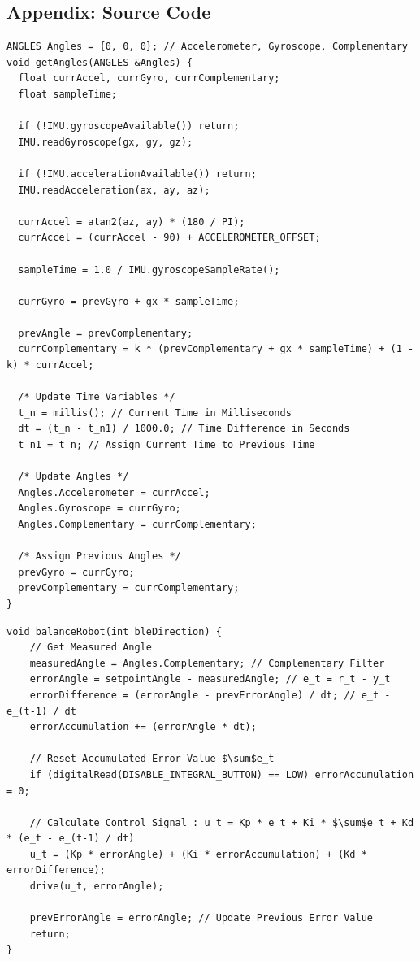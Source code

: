 \documentclass{article}
\begin{document}
\subsection{Appendix: Source Code}

\begin{lstlisting}[caption={Source Code : Arduino IMU Complementary Filter}, label={lst:arduino_angle_code}]
ANGLES Angles = {0, 0, 0}; // Accelerometer, Gyroscope, Complementary
void getAngles(ANGLES &Angles) {
  float currAccel, currGyro, currComplementary;
  float sampleTime;

  if (!IMU.gyroscopeAvailable()) return;
  IMU.readGyroscope(gx, gy, gz);

  if (!IMU.accelerationAvailable()) return;
  IMU.readAcceleration(ax, ay, az);

  currAccel = atan2(az, ay) * (180 / PI);
  currAccel = (currAccel - 90) + ACCELEROMETER_OFFSET;

  sampleTime = 1.0 / IMU.gyroscopeSampleRate();

  currGyro = prevGyro + gx * sampleTime;

  prevAngle = prevComplementary;
  currComplementary = k * (prevComplementary + gx * sampleTime) + (1 - k) * currAccel;

  /* Update Time Variables */
  t_n = millis(); // Current Time in Milliseconds
  dt = (t_n - t_n1) / 1000.0; // Time Difference in Seconds
  t_n1 = t_n; // Assign Current Time to Previous Time

  /* Update Angles */
  Angles.Accelerometer = currAccel;
  Angles.Gyroscope = currGyro;
  Angles.Complementary = currComplementary;

  /* Assign Previous Angles */
  prevGyro = currGyro;
  prevComplementary = currComplementary;
}
\end{lstlisting}

\begin{lstlisting}[caption={Source Code : Arduino PID Controller}, label={lst:arduino_pid_code}]
void balanceRobot(int bleDirection) {
    // Get Measured Angle
    measuredAngle = Angles.Complementary; // Complementary Filter
    errorAngle = setpointAngle - measuredAngle; // e_t = r_t - y_t
    errorDifference = (errorAngle - prevErrorAngle) / dt; // e_t - e_(t-1) / dt
    errorAccumulation += (errorAngle * dt);

    // Reset Accumulated Error Value $\sum$e_t
    if (digitalRead(DISABLE_INTEGRAL_BUTTON) == LOW) errorAccumulation = 0;

    // Calculate Control Signal : u_t = Kp * e_t + Ki * $\sum$e_t + Kd * (e_t - e_(t-1) / dt)
    u_t = (Kp * errorAngle) + (Ki * errorAccumulation) + (Kd * errorDifference);
    drive(u_t, errorAngle);

    prevErrorAngle = errorAngle; // Update Previous Error Value
    return;
}
\end{lstlisting}
\end{document}
